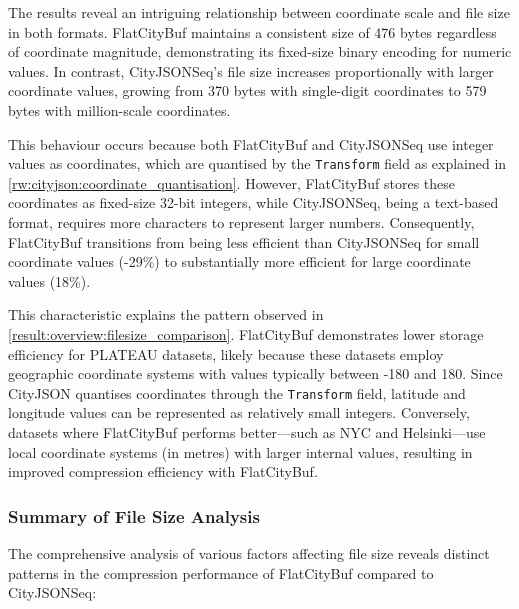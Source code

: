 The results reveal an intriguing relationship between coordinate scale and file size in both formats. FlatCityBuf maintains a consistent size of 476 bytes regardless of coordinate magnitude, demonstrating its fixed-size binary encoding for numeric values. In contrast, CityJSONSeq's file size increases proportionally with larger coordinate values, growing from 370 bytes with single-digit coordinates to 579 bytes with million-scale coordinates.

This behaviour occurs because both FlatCityBuf and CityJSONSeq use integer values as coordinates, which are quantised by the \texttt{Transform} field as explained in \autoref{rw:cityjson:coordinate_quantisation}. However, FlatCityBuf stores these coordinates as fixed-size 32-bit integers, while CityJSONSeq, being a text-based format, requires more characters to represent larger numbers. Consequently, FlatCityBuf transitions from being less efficient than CityJSONSeq for small coordinate values (-29\%) to substantially more efficient for large coordinate values (18\%).

This characteristic explains the pattern observed in \autoref{result:overview:filesize_comparison}. FlatCityBuf demonstrates lower storage efficiency for PLATEAU datasets, likely because these datasets employ geographic coordinate systems with values typically between -180 and 180. Since CityJSON quantises coordinates through the \texttt{Transform} field, latitude and longitude values can be represented as relatively small integers. Conversely, datasets where FlatCityBuf performs better—such as NYC and Helsinki—use local coordinate systems (in metres) with larger internal values, resulting in improved compression efficiency with FlatCityBuf.

\subsubsection{Summary of File Size Analysis}
\label{result:overview:analysis_of_file_size_results:summary}

The comprehensive analysis of various factors affecting file size reveals distinct patterns in the compression performance of FlatCityBuf compared to CityJSONSeq:

